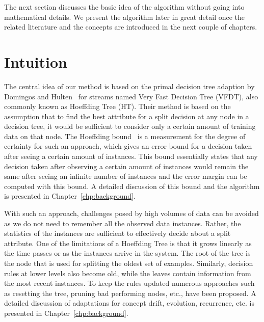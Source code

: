 The next section discusses the basic idea of the algorithm without going into mathematical details. We present the algorithm later in great detail once the related literature and the concepts are introduced in the next couple of chapters.

\section{Intuition}
\label{sec:intro:intu}
The central idea of our method is based on the primal decision tree adaption by Domingos and Hulten~\cite{domingos00:vfdt} for streams named Very Fast Decision Tree (VFDT), also commonly known as Hoeffding Tree (HT). Their method is based on the assumption that to find the best attribute for a split decision at any node in a decision tree, it would be sufficient to consider only a certain amount of training data on that node. The Hoeffding bound~\cite{hoeffding63:bound} is a measurement for the degree of certainty for such an approach, which gives an error bound for a decision taken after seeing a certain amount of instances. This bound essentially states that any decision taken after observing a certain amount of instances would remain the same after seeing an infinite number of instances and the error margin can be computed with this bound. A detailed discussion of this bound and the algorithm is presented in Chapter~\ref{chp:background}.

With such an approach, challenges posed by high volumes of data can be avoided as we do not need to remember all the observed data instances. Rather, the statistics of the instances are sufficient to effectively decide about a split attribute. One of the limitations of a Hoeffding Tree is that it grows linearly as the time passes or as the instances arrive in the system. The root of the tree is the node that is used for splitting the oldest set of examples. Similarly, decision rules at lower levels also become old, while the leaves contain information from the most recent instances. To keep the rules updated numerous approaches such as resetting the tree, pruning bad performing nodes, etc., have been proposed. A detailed discussion of adaptations for concept drift, evolution, recurrence, etc. is presented in Chapter~\ref{chp:background}.

